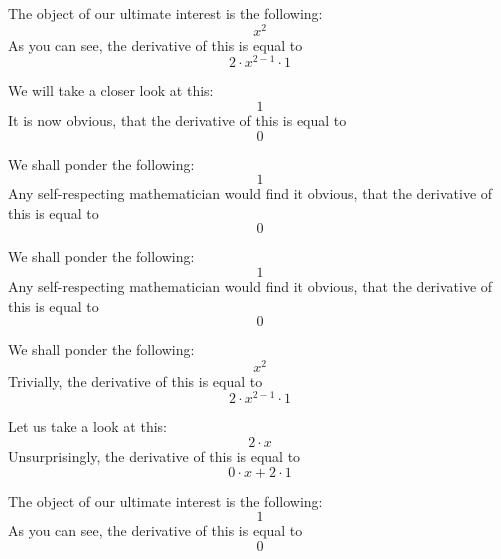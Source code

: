 \documentclass{article}
\begin{document}
The object of our ultimate interest is the following:
\begin{equation}
x ^{2 } 
\end{equation}
As you can see, the derivative of this is equal to
\begin{equation}
2 \cdot x ^{2 - 1 } \cdot 1 
\end{equation}

We will take a closer look at this:
\begin{equation}
1 
\end{equation}
It is now obvious, that the derivative of this is equal to
\begin{equation}
0 
\end{equation}

We shall ponder the following:
\begin{equation}
1 
\end{equation}
Any self-respecting mathematician would find it obvious, that the derivative of this is equal to
\begin{equation}
0 
\end{equation}

We shall ponder the following:
\begin{equation}
1 
\end{equation}
Any self-respecting mathematician would find it obvious, that the derivative of this is equal to
\begin{equation}
0 
\end{equation}

We shall ponder the following:
\begin{equation}
x ^{2 } 
\end{equation}
Trivially, the derivative of this is equal to
\begin{equation}
2 \cdot x ^{2 - 1 } \cdot 1 
\end{equation}

Let us take a look at this:
\begin{equation}
2 \cdot x 
\end{equation}
Unsurprisingly, the derivative of this is equal to
\begin{equation}
0 \cdot x + 2 \cdot 1 
\end{equation}

The object of our ultimate interest is the following:
\begin{equation}
1 
\end{equation}
As you can see, the derivative of this is equal to
\begin{equation}
0 
\end{equation}
\end{document}
